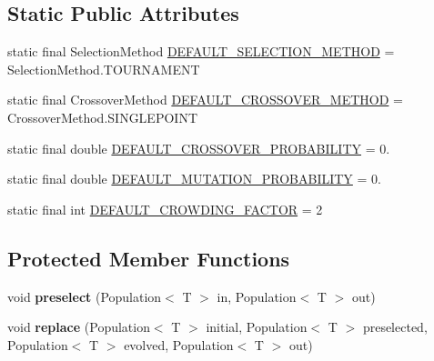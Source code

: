 \subsection*{Static Public Attributes}
\begin{DoxyCompactItemize}
\item 
static final Selection\-Method \hyperlink{classjenes_1_1stage_1_1operator_1_1common_1_1_de_jong_crowder_3_01_t_01extends_01_chromosome_01_4_a21277e6e0728d4e83cc353337bc5f66d}{D\-E\-F\-A\-U\-L\-T\-\_\-\-S\-E\-L\-E\-C\-T\-I\-O\-N\-\_\-\-M\-E\-T\-H\-O\-D} = Selection\-Method.\-T\-O\-U\-R\-N\-A\-M\-E\-N\-T
\item 
static final Crossover\-Method \hyperlink{classjenes_1_1stage_1_1operator_1_1common_1_1_de_jong_crowder_3_01_t_01extends_01_chromosome_01_4_a2798047916292a1449952a7274f9f26d}{D\-E\-F\-A\-U\-L\-T\-\_\-\-C\-R\-O\-S\-S\-O\-V\-E\-R\-\_\-\-M\-E\-T\-H\-O\-D} = Crossover\-Method.\-S\-I\-N\-G\-L\-E\-P\-O\-I\-N\-T
\item 
static final double \hyperlink{classjenes_1_1stage_1_1operator_1_1common_1_1_de_jong_crowder_3_01_t_01extends_01_chromosome_01_4_a522c94dff2a39743f6dfddec03a2ce47}{D\-E\-F\-A\-U\-L\-T\-\_\-\-C\-R\-O\-S\-S\-O\-V\-E\-R\-\_\-\-P\-R\-O\-B\-A\-B\-I\-L\-I\-T\-Y} = 0.
\item 
static final double \hyperlink{classjenes_1_1stage_1_1operator_1_1common_1_1_de_jong_crowder_3_01_t_01extends_01_chromosome_01_4_a19680564524e8d194044526740001c84}{D\-E\-F\-A\-U\-L\-T\-\_\-\-M\-U\-T\-A\-T\-I\-O\-N\-\_\-\-P\-R\-O\-B\-A\-B\-I\-L\-I\-T\-Y} = 0.
\item 
static final int \hyperlink{classjenes_1_1stage_1_1operator_1_1common_1_1_de_jong_crowder_3_01_t_01extends_01_chromosome_01_4_a7e7afe01b26af0cdd28d392ab7866576}{D\-E\-F\-A\-U\-L\-T\-\_\-\-C\-R\-O\-W\-D\-I\-N\-G\-\_\-\-F\-A\-C\-T\-O\-R} = 2
\end{DoxyCompactItemize}
\subsection*{Protected Member Functions}
\begin{DoxyCompactItemize}
\item 
\hypertarget{classjenes_1_1stage_1_1operator_1_1common_1_1_de_jong_crowder_3_01_t_01extends_01_chromosome_01_4_a98f463e26bf3fd0fd703320007302594}{void {\bfseries preselect} (Population$<$ T $>$ in, Population$<$ T $>$ out)}\label{classjenes_1_1stage_1_1operator_1_1common_1_1_de_jong_crowder_3_01_t_01extends_01_chromosome_01_4_a98f463e26bf3fd0fd703320007302594}

\item 
\hypertarget{classjenes_1_1stage_1_1operator_1_1common_1_1_de_jong_crowder_3_01_t_01extends_01_chromosome_01_4_a7d659276ad2103199080458c85acf59e}{void {\bfseries replace} (Population$<$ T $>$ initial, Population$<$ T $>$ preselected, Population$<$ T $>$ evolved, Population$<$ T $>$ out)}\label{classjenes_1_1stage_1_1operator_1_1common_1_1_de_jong_crowder_3_01_t_01extends_01_chromosome_01_4_a7d659276ad2103199080458c85acf59e}

\end{DoxyCompactItemize}
